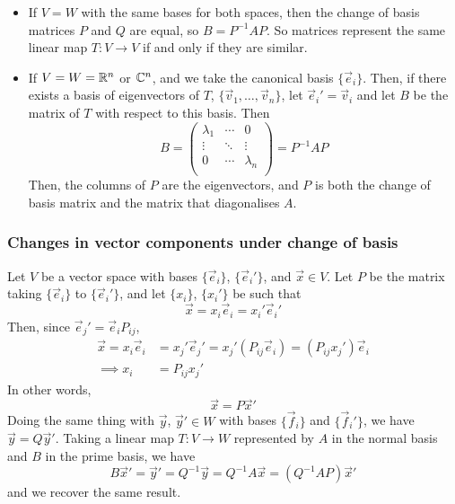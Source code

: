 \documentclass{../template/note}
\begin{document}
    \begin{remark*}
        \begin{itemize}
            \item If \(V = W\) with the same bases for both spaces, then the change of basis matrices \(P\) and \(Q\) are equal, so \(B = P^{-1}AP\). So matrices represent the same linear map \(T: V \to V\) if and only if they are similar.
            \item If \(V = W = \mathbb R^n\) or \(\mathbb C^n\), and we take the canonical basis \(\{\vec e_i\}\). Then, if there exists a basis of eigenvectors of \(T\), \(\{\vec v_1, \dots, \vec v_n\}\), let \(\vec e_i' = \vec v_i\) and let \(B\) be the matrix of \(T\) with respect to this basis. Then
            \[
                B = \begin{pmatrix}
                 \lambda_1 & \cdots & 0 \\
                 \vdots & \ddots & \vdots \\
                 0 & \cdots & \lambda_n \\
                \end{pmatrix} = P^{-1}AP
            \]
            Then, the columns of \(P\) are the eigenvectors, and \(P\) is both the change of basis matrix and the matrix that diagonalises \(A\).
        \end{itemize}
    \end{remark*}

    
    \subsubsection{Changes in vector components under change of basis}
    
    Let \(V\) be a vector space with bases \(\{\vec e_i\}\), \(\{\vec e_i'\}\), and \(\vec x \in V\). Let \(P\) be the matrix taking \(\{\vec e_i\}\) to \(\{\vec e_i'\}\), and let \(\{x_i\}\), \(\{x_i'\}\) be such that
    \[
        \vec x = x_i \vec e_i = x_i' \vec e_i'
    \]
    Then, since \(\vec e_j' = \vec e_i P_{ij}\),
    \begin{align*}
        \vec x = x_i \vec e_i &= x_j' \vec e_j' = x_j'(P_{ij} \vec e_i) = (P_{ij}x_j')\vec e_i \\
        \implies x_i &= P_{ij} x_j'
    \end{align*}
    In other words,
    \[
        \vec x = P \vec x'
    \]
    Doing the same thing with \(\vec y\), \(\vec y' \in W\) with bases \(\{\vec f_i\}\) and \(\{\vec f_i'\}\), we have \(\vec y = Q\vec y'\). Taking a linear map \(T: V \to W\) represented by \(A\) in the normal basis and \(B\) in the prime basis, we have
    \[
        B \vec x' = \vec y' = Q^{-1} \vec y = Q^{-1}A \vec x = (Q^{-1}AP) \vec x'
    \]
    and we recover the same result.
\end{document}
